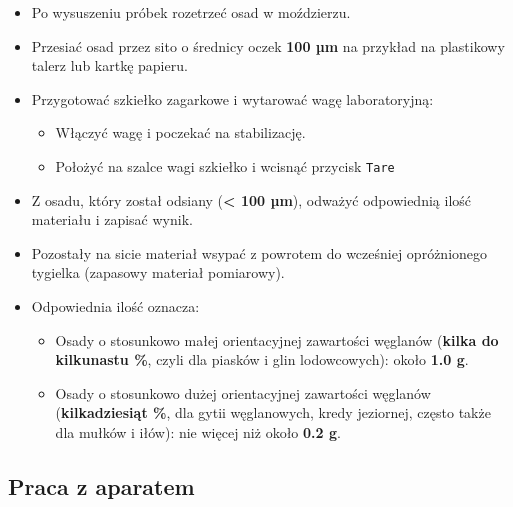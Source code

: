 \documentclass[
  letterpaper,
  DIV=11,
  numbers=noendperiod]{scrreprt}
\begin{document}
\begin{itemize}
\item
  Po wysuszeniu próbek rozetrzeć osad w moździerzu.
\item
  Przesiać osad przez sito o średnicy oczek \textbf{100 µm} na przykład
  na plastikowy talerz lub kartkę papieru.
\item
  Przygotować szkiełko zagarkowe i wytarować wagę laboratoryjną:

  \begin{itemize}
  \item
    Włączyć wagę i poczekać na stabilizację.
  \item
    Położyć na szalce wagi szkiełko i wcisnąć przycisk \texttt{Tare}
  \end{itemize}
\item
  Z osadu, który został odsiany (\textbf{\textless{} 100 µm}), odważyć
  odpowiednią ilość materiału i zapisać wynik.
\item
  Pozostały na sicie materiał wsypać z powrotem do wcześniej
  opróżnionego tygielka (zapasowy materiał pomiarowy).
\item
  Odpowiednia ilość oznacza:

  \begin{itemize}
  \item
    Osady o stosunkowo małej orientacyjnej zawartości węglanów
    (\textbf{kilka do kilkunastu \%}, czyli dla piasków i glin
    lodowcowych): około \textbf{1.0 g}.
  \item
    Osady o stosunkowo dużej orientacyjnej zawartości węglanów
    (\textbf{kilkadziesiąt \%}, dla gytii węglanowych, kredy jeziornej,
    często także dla mułków i iłów): nie więcej niż około \textbf{0.2
    g}.
  \end{itemize}
\end{itemize}

\hypertarget{praca-z-aparatem}{%
\subsection{Praca z aparatem}\label{praca-z-aparatem}}
\end{document}
